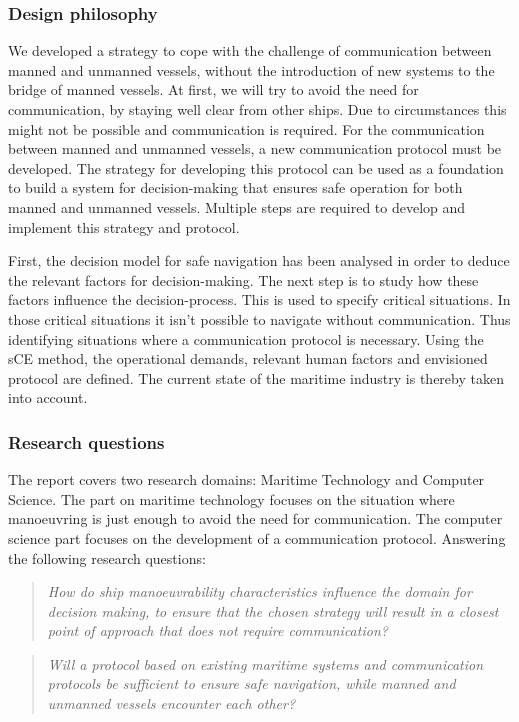 \subsubsection*{Design philosophy}
We developed a strategy to cope with the challenge of communication between manned and unmanned vessels, without the introduction of new systems to the bridge of manned vessels. 
At first, we will try to avoid the need for communication, by staying well clear from other ships. Due to circumstances this might not be possible and communication is required. For the communication between manned and unmanned vessels, a new communication protocol must be developed.
The strategy for developing this protocol can be used as a foundation to build a system for decision-making that ensures safe operation for both manned and unmanned vessels. Multiple steps are required to develop and implement this strategy and protocol.

First, the decision model for safe navigation has been analysed in order to deduce the relevant factors for decision-making. The next step is to study how these factors influence the decision-process. This is used to specify critical situations. In those critical situations it isn't possible to navigate without communication. Thus identifying situations where a communication protocol is necessary. Using the \acf{sCE} method, the operational demands, relevant human factors and envisioned protocol are defined. The current state of the maritime industry is thereby taken into account.

\subsubsection*{Research questions}
The report covers two research domains: Maritime Technology and Computer Science. The part on maritime technology focuses on the situation where manoeuvring is just enough to avoid the need for communication. The computer science part focuses on the development of a communication protocol. Answering the following research questions:

\begin{quotation}
	\emph{How do ship manoeuvrability characteristics influence the domain for decision making, to ensure that the chosen strategy will result in a closest point of approach that does not require communication?} 
\end{quotation}

\begin{quotation}
	\emph{Will a protocol based on existing maritime systems and communication protocols be sufficient to ensure safe navigation, while manned and unmanned vessels encounter each other?}
\end{quotation}


